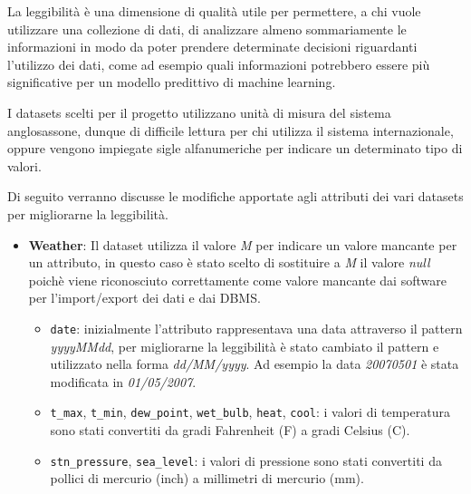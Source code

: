 La leggibilità è una dimensione di qualità utile per permettere, a chi vuole 
utilizzare una collezione di dati, di analizzare almeno sommariamente le 
informazioni in modo da poter prendere determinate decisioni riguardanti 
l'utilizzo dei dati, come ad esempio quali informazioni potrebbero essere più 
significative per un modello predittivo di machine learning.

I datasets scelti per il progetto utilizzano unità di misura del 
sistema anglosassone, dunque di difficile lettura per chi utilizza il sistema 
internazionale, oppure vengono impiegate sigle alfanumeriche per indicare 
un determinato tipo di valori. 

Di seguito verranno discusse le modifiche 
apportate agli attributi dei vari datasets per migliorarne la leggibilità.

\begin{itemize}

    \item \textbf{Weather}: Il dataset utilizza il valore \textit{M} per 
        indicare un valore mancante per un attributo, in questo caso è stato 
        scelto di sostituire a \textit{M} il valore \textit{null} poichè viene 
        riconosciuto correttamente come valore mancante dai software per 
        l'import/export dei dati e dai DBMS.
        
        \begin{itemize}
            
            \item \texttt{date}: inizialmente l'attributo rappresentava una 
                data attraverso il pattern \textit{yyyyMMdd}, per migliorarne 
                la leggibilità è stato cambiato il pattern e utilizzato nella 
                forma \textit{dd/MM/yyyy}. Ad esempio la data 
                \textit{20070501} è stata modificata in \textit{01/05/2007}.
        
            \item \texttt{t\_max}, \texttt{t\_min}, \texttt{dew\_point}, 
                \texttt{wet\_bulb}, \texttt{heat}, \texttt{cool}: i valori di 
                temperatura sono stati convertiti da gradi Fahrenheit (F) 
                a gradi Celsius (C).

            \item \texttt{stn\_pressure}, \texttt{sea\_level}: i valori di 
                pressione sono stati convertiti da pollici di mercurio (inch) a 
                millimetri di mercurio (mm).


\end{itemize}
\end{itemize}
